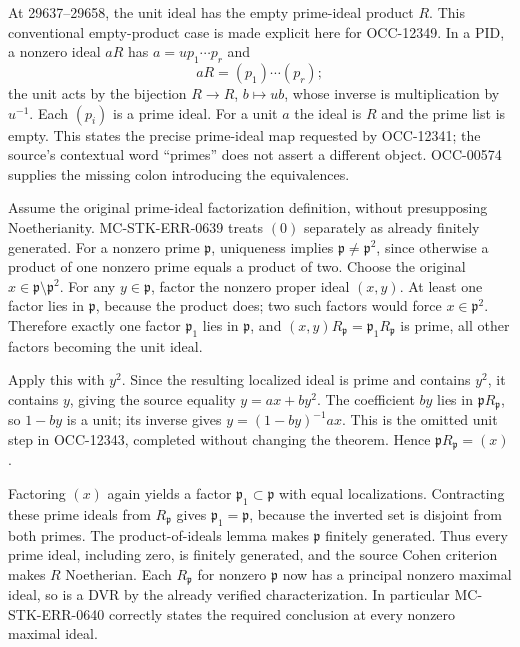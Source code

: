 At 29637--29658, the unit ideal has the empty prime-ideal product \(R\). This conventional empty-product case is made explicit here for OCC-12349. In a PID, a nonzero ideal \(aR\) has \(a=u p_1\cdots p_r\) and \[
 aR=(p_1)\cdots(p_r);
\] the unit acts by the bijection \(R\to R\), \(b\mapsto ub\), whose inverse is multiplication by \(u^{-1}\). Each \((p_i)\) is a prime ideal. For a unit \(a\) the ideal is \(R\) and the prime list is empty. This states the precise prime-ideal map requested by OCC-12341; the source's contextual word ``primes'' does not assert a different object. OCC-00574 supplies the missing colon introducing the equivalences.

Assume the original prime-ideal factorization definition, without presupposing Noetherianity. MC-STK-ERR-0639 treats \((0)\) separately as already finitely generated. For a nonzero prime \(\mathfrak p\), uniqueness implies \(\mathfrak p\ne\mathfrak p^2\), since otherwise a product of one nonzero prime equals a product of two. Choose the original \(x\in\mathfrak p\setminus\mathfrak p^2\). For any \(y\in\mathfrak p\), factor the nonzero proper ideal \((x,y)\). At least one factor lies in \(\mathfrak p\), because the product does; two such factors would force \(x\in\mathfrak p^2\). Therefore exactly one factor \(\mathfrak p_1\) lies in \(\mathfrak p\), and \((x,y)R_{\mathfrak p}=\mathfrak p_1R_{\mathfrak p}\) is prime, all other factors becoming the unit ideal.

Apply this with \(y^2\). Since the resulting localized ideal is prime and contains \(y^2\), it contains \(y\), giving the source equality \(y=ax+by^2\). The coefficient \(by\) lies in \(\mathfrak pR_{\mathfrak p}\), so \(1-by\) is a unit; its inverse gives \(y=(1-by)^{-1}ax\). This is the omitted unit step in OCC-12343, completed without changing the theorem. Hence \(\mathfrak pR_{\mathfrak p}=(x)\).

Factoring \((x)\) again yields a factor \(\mathfrak p_1\subset\mathfrak p\) with equal localizations. Contracting these prime ideals from \(R_{\mathfrak p}\) gives \(\mathfrak p_1=\mathfrak p\), because the inverted set is disjoint from both primes. The product-of-ideals lemma makes \(\mathfrak p\) finitely generated. Thus every prime ideal, including zero, is finitely generated, and the source Cohen criterion makes \(R\) Noetherian. Each \(R_{\mathfrak p}\) for nonzero \(\mathfrak p\) now has a principal nonzero maximal ideal, so is a DVR by the already verified characterization. In particular MC-STK-ERR-0640 correctly states the required conclusion at every nonzero maximal ideal.

